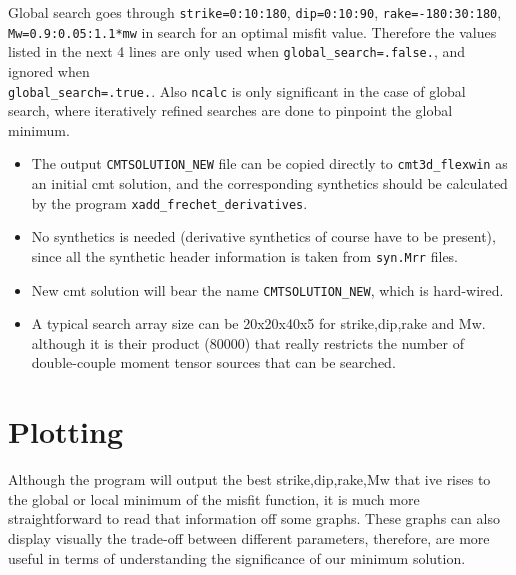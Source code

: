 \documentclass[12pt,titlepage,fleqn]{article}
\begin{document}
Global search goes through \verb-strike=0:10:180-, \verb-dip=0:10:90-, \verb?rake=-180:30:180?, \verb-Mw=0.9:0.05:1.1*mw- in search for an optimal misfit value. Therefore the values listed in the next 4 lines are only used when \verb-global_search=.false.-, and ignored when \\
\verb-global_search=.true.-. Also \verb-ncalc- is only significant in the case of global search, where iteratively refined searches are done to pinpoint the global minimum.



\begin{itemize}
\item The output \verb=CMTSOLUTION_NEW= file can be copied directly to \verb=cmt3d_flexwin= as an initial cmt solution, and the corresponding synthetics should be calculated by the program \verb=xadd_frechet_derivatives=.
\item No synthetics is needed (derivative synthetics of course have to be present), since all the synthetic header information is taken from \verb=syn.Mrr= files.
\item New cmt solution will bear the name \verb-CMTSOLUTION_NEW-, which is hard-wired.
\item A typical search array size can be 20x20x40x5 for strike,dip,rake and Mw. although it is their product (80000) that really restricts the number of double-couple moment tensor sources that can be searched.
\end{itemize}


\section{Plotting}

Although the program will output the best strike,dip,rake,Mw that ive rises to the global or local minimum of the misfit function, it is much more straightforward to read that information off some graphs. These graphs can also display visually the trade-off between different parameters, therefore, are more useful in terms of understanding the significance of our minimum solution.
\end{document}
